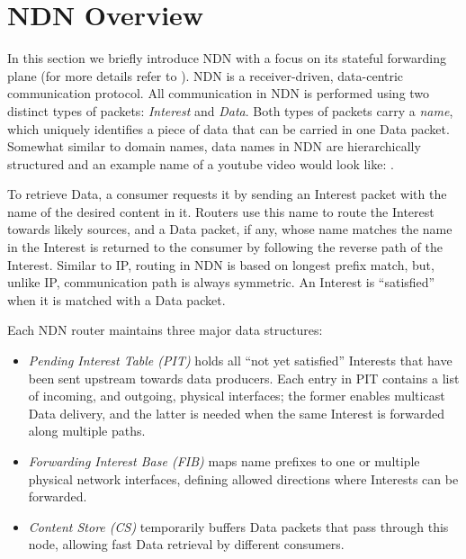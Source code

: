 \section{NDN Overview\label{sec:ccn-intro}}

In this section we briefly introduce NDN with a focus on its stateful forwarding plane (for more details refer to \cite{ndn-conext, ndn-tr, adaptive-forwarding}).
NDN is a receiver-driven, data-centric communication protocol.
All communication in NDN is performed using two distinct types of packets: \textit{Interest} and \textit{Data}. Both types of packets carry a \textit{name}, which uniquely identifies a piece of data that can be carried in one Data packet. Somewhat similar to domain names, data names in NDN are hierarchically structured and an example name of a youtube video would look like: .

To retrieve Data, a consumer requests it by sending an Interest packet with the name of the desired content in it.
Routers use this name to route the Interest towards likely sources, and a Data packet, if any, whose name matches the name in the Interest is returned to the consumer by following the reverse path of the Interest. Similar to IP, routing in NDN is based on longest prefix match, but, unlike IP,  communication path is always symmetric. An Interest is ``satisfied'' when it is matched with a Data packet.

Each NDN router maintains three major data structures:
\begin{itemize}
\item \textit{Pending Interest Table (PIT)} holds all ``not yet satisfied'' Interests that have been sent upstream towards data producers. Each entry in PIT contains a list of incoming, and outgoing, physical interfaces; the former enables multicast Data delivery, and the latter is needed when the same Interest is forwarded along multiple paths.
\item \textit{Forwarding Interest Base (FIB)} maps name prefixes to one or multiple physical network interfaces, defining allowed %
 directions where Interests can be forwarded. 
\item \textit{Content Store (CS)} temporarily buffers Data packets that pass through this node, allowing fast Data retrieval by different consumers.
\end{itemize}


